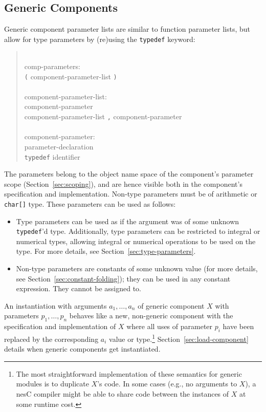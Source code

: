 \documentclass[11pt,letterpaper]{article}
\newcommand{\kw}[1]{{\tt #1}}
\newcommand{\code}[1]{{\tt #1}}
\newcommand{\nesc}{nesC\xspace}
\newcommand{\grammarshift}{\vspace*{-.7cm}}
\newcommand{\grammarindent}{\hspace*{2cm}\= \\ \kill}
\begin{document}
\subsection{Generic Components}
\label{sec:generic-components}

Generic component parameter lists are similar to function parameter lists,
but allow for type parameters by (re)using the \kw{typedef} keyword:
\begin{quote} \grammarshift \em \begin{tabbing}
\grammarindent
comp-parameters:\\
\>	\kw{(} component-parameter-list \kw{)}\\
\\
component-parameter-list:\\
\>	component-parameter\\
\>	component-parameter-list \kw{,} component-parameter\\
\\
component-parameter:\\
\>	parameter-declaration\\
\>	\kw{typedef} identifier
\end{tabbing} \end{quote}
The parameters belong to the object name space of the component's parameter
scope (Section~\ref{sec:scoping}), and are hence visible both in the
component's specification and implementation. Non-type parameters must be
of arithmetic or \code{char[]} type. These parameters can be used as
follows:
\begin{itemize}
\item Type parameters can be used as if the argument was of some unknown
\kw{typedef}'d type. Additionally, type parameters can be restricted to
integral or numerical types, allowing integral or numerical operations to
be used on the type. For more details, see
Section~\ref{sec:type-parameters}.
\item Non-type parameters are constants of some unknown value (for more
details, see Section~\ref{sec:constant-folding}); they can be used in any
constant expression. They cannot be assigned to.
\end{itemize}

An instantiation with arguments $a_1, \ldots, a_n$ of generic component $X$
with parameters $p_1, \ldots, p_n$ behaves like a new, non-generic component
with the specification and implementation of $X$ where all uses of
parameter $p_i$ have been replaced by the corresponding $a_i$ value or
type.\footnote{The most straightforward implementation of these semantics
for generic modules is to duplicate $X$'s code. In some cases (e.g., no
arguments to $X$), a \nesc compiler might be able to share code between the
instances of $X$ at some runtime cost.} Section~\ref{sec:load-component}
details when generic components get instantiated.
\end{document}
